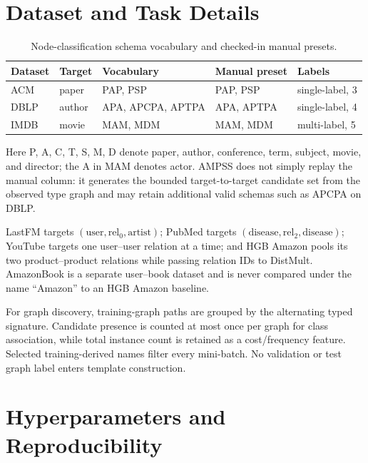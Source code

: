 \section{Dataset and Task Details}
\label{app:datasets}

\begin{table}[h]
  \centering
  \caption{Node-classification schema vocabulary and checked-in manual presets.}
  \small
  \begin{tabular}{lllll}
    \toprule
    \textbf{Dataset} & \textbf{Target} & \textbf{Vocabulary} & \textbf{Manual preset} & \textbf{Labels} \\
    \midrule
    ACM & paper & PAP, PSP & PAP, PSP & single-label, 3 \\
    DBLP & author & APA, APCPA, APTPA & APA, APTPA & single-label, 4 \\
    IMDB & movie & MAM, MDM & MAM, MDM & multi-label, 5 \\
    \bottomrule
  \end{tabular}
\end{table}

Here P, A, C, T, S, M, D denote paper, author, conference, term, subject, movie, and director;
the A in MAM denotes actor. AMPSS does not simply replay the manual column: it generates the
bounded target-to-target candidate set from the observed type graph and may retain additional
valid schemas such as APCPA on DBLP.

LastFM targets $(\text{user},\mathrm{rel}_0,\text{artist})$; PubMed targets
$(\text{disease},\mathrm{rel}_2,\text{disease})$; YouTube targets one user--user relation at a
time; and HGB Amazon pools its two product--product relations while passing relation IDs to
DistMult. AmazonBook is a separate user--book dataset and is never compared under the name
``Amazon'' to an HGB Amazon baseline.

For graph discovery, training-graph paths are grouped by the alternating typed signature.
Candidate presence is counted at most once per graph for class association, while total instance
count is retained as a cost/frequency feature. Selected training-derived names filter every
mini-batch. No validation or test graph label enters template construction.

\section{Hyperparameters and Reproducibility}
\label{app:hyperparameters}

